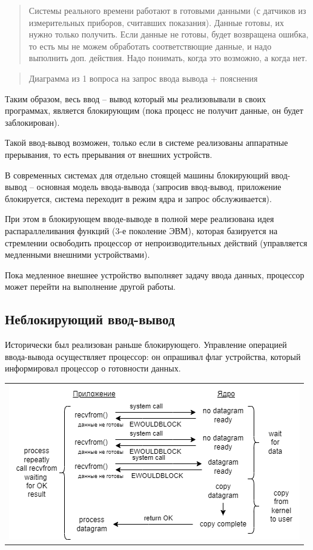 \begin{quote}
Системы реального времени работают в готовыми данными (с датчиков из измерительных приборов, считавших показания). Данные готовы, их нужно только получить. Если данные не готовы, будет возвращена ошибка, то есть мы не можем обработать соответствющие данные, и надо выполнить доп. действия. Надо понимать, когда это возможно, а когда нет.
\end{quote}

\begin{quote}
Диаграмма из 1 вопроса на запрос ввода вывода + пояснения
\end{quote}

Таким образом, весь ввод – вывод который мы реализовывали в своих программах, является блокирующим (пока процесс не получит данные, он будет заблокирован). 

Такой ввод-вывод возможен, только если в системе реализованы аппаратные прерывания, то есть прерывания от внешних устройств. 

В современных системах для отдельно стоящей машины блокирующий ввод-вывод – основная модель ввода-вывода (запросив ввод-вывод, приложение блокируется, система переходит в режим ядра и запрос обслуживается).

При этом в блокирующем вводе-выводе в полной мере реализована идея распараллеливания функций (3-е поколение ЭВМ), которая базируется на стремлении освободить процессор от непроизводительных действий (управляется медленными внешними устройствами).

Пока медленное внешнее устройство выполняет задачу ввода данных, процессор может перейти на выполнение другой работы.

\subsection{Неблокирующий ввод-вывод}

Исторически был реализован раньше блокирующего. Управление операцией ввода-вывода осуществляет процессор: он опрашивал флаг устройства, который информировал процессор о готовности данных.
\begin{table}[H]
  \centering
  \begin{tabular}{p{1\linewidth}}
    \centering
    \includegraphics[width=0.8\linewidth]{./images/1-2.png}
  \end{tabular}
\end{table}

